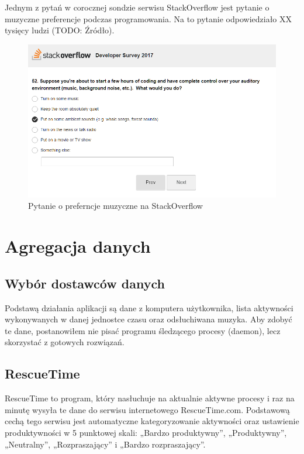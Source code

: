 \documentclass[brudnopis]{xmgr}
\begin{document}
Jednym z pytań w corocznej sondzie serwisu StackOverflow jest pytanie o muzyczne preferencje podczas programowania.
Na to pytanie odpowiedziało XX tysięcy ludzi (TODO: Źródło).

\begin{figure}
  \includegraphics[width=\linewidth]{fig/stack_overflow_music.png}
  \caption{Pytanie o preferncje muzyczne na StackOverflow}
  \label{fig:Pytanie o preferncje muzyczne na StackOverflow}
\end{figure}


\chapter{Agregacja danych}

    \section{Wybór dostawców danych}

    Podstawą działania aplikacji są dane z komputera użytkownika,
    lista aktywności wykonywanych w danej jednostce czasu oraz odsłuchiwana muzyka.
    Aby zdobyć te dane, postanowiłem nie pisać programu śledzącego procesy (daemon),
    lecz skorzystać z gotowych rozwiązań.

        \section*{RescueTime}

        RescueTime to program, który nasłuchuje na aktualnie aktywne procesy
        i raz na minutę wysyła te dane do serwisu internetowego RescueTime.com.
        Podstawową cechą tego serwisu jest automatyczne kategoryzowanie aktywności oraz ustawienie produktywności w 5 punktowej skali:
        „Bardzo produktywny”, „Produktywny”, „Neutralny”, „Rozpraszający” i „Bardzo rozpraszający”.
\end{document}

